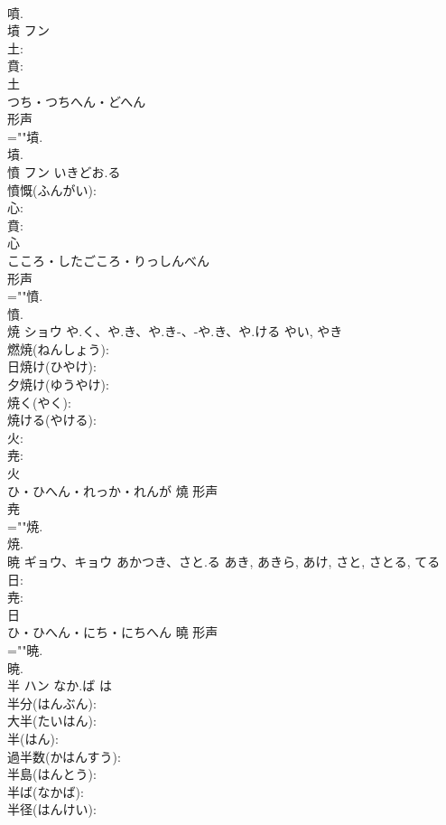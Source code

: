 \documentclass[8pt]{extreport}
\begin{document}
\begin{CJK}{UTF8}{min}
\\	噴.
\\	墳	フン			
\\	土: 
\\	賁: 
\\	土	
\\	つち・つちへん・どへん	
\\	形声 
\\	=""墳.
\\	墳.
\\	憤	フン	いきどお.る		
\\	憤慨(ふんがい): 
\\	心: 
\\	賁: 
\\	心	
\\	こころ・したごころ・りっしんべん	
\\	形声 
\\	=""憤.
\\	憤.
\\	焼	ショウ	や.く、や.き、や.き-、-や.き、や.ける	やい, やき	
\\	燃焼(ねんしょう): 
\\	日焼け(ひやけ): 
\\	夕焼け(ゆうやけ): 
\\	焼く(やく): 
\\	焼ける(やける): 
\\	火: 
\\	尭: 
\\	火	
\\	ひ・ひへん・れっか・れんが	燒	形声 
\\	尭 
\\	=""焼.
\\	焼.
\\	暁	ギョウ、キョウ	あかつき、さと.る	あき, あきら, あけ, さと, さとる, てる	
\\	日: 
\\	尭: 
\\	日	
\\	ひ・ひへん・にち・にちへん	曉	形声 
\\	=""暁.
\\	暁.
\\	半	ハン	なか.ば	は	
\\	半分(はんぶん): 
\\	大半(たいはん): 
\\	半(はん): 
\\	過半数(かはんすう): 
\\	半島(はんとう): 
\\	半ば(なかば): 
\\	半径(はんけい): 

\end{CJK}
\end{document}
